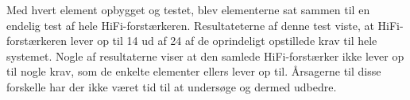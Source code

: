 Med hvert element opbygget og testet, blev elementerne sat sammen til en endelig test af hele HiFi-forstærkeren. Resultateterne af denne test viste, at HiFi-forstærkeren lever op til 14 ud af 24 af de oprindeligt opstillede krav til hele systemet. Nogle af resultaterne viser at den samlede HiFi-forstærker ikke lever op til nogle krav, som de enkelte elementer ellers lever op til. Årsagerne til disse forskelle har der ikke været tid til at undersøge og dermed udbedre.


